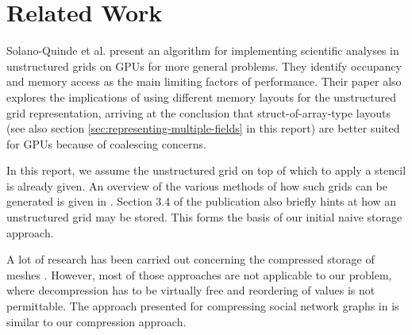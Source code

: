 \chapter*{Related Work}

Solano-Quinde et al. \cite{solano2011} present an algorithm for implementing scientific analyses in unstructured grids on GPUs for more general problems. They identify occupancy and memory access as the main limiting factors of performance. Their paper also explores the implications of using different memory layouts for the unstructured grid representation, arriving at the conclusion that struct-of-array-type layouts (see also section \ref{sec:representing-multiple-fields} in this report) are better suited for GPUs because of coalescing concerns. 

In this report, we assume the unstructured grid on top of which to apply a stencil is already given. An overview of the various methods of how such grids can be generated is given in \cite{mavriplis1997}. Section 3.4 of the publication also briefly hints at how an unstructured grid may be stored. This forms the basis of our initial naive storage approach.

A lot of research has been carried out concerning the compressed storage of meshes \cite{edgebreaker}\cite{edgebreaker-quadrilateral}. However, most of those approaches are not applicable to our problem, where decompression has to be virtually free and reordering of values is not permittable. The approach presented for compressing social network graphs in \cite{social} is similar to our compression approach.